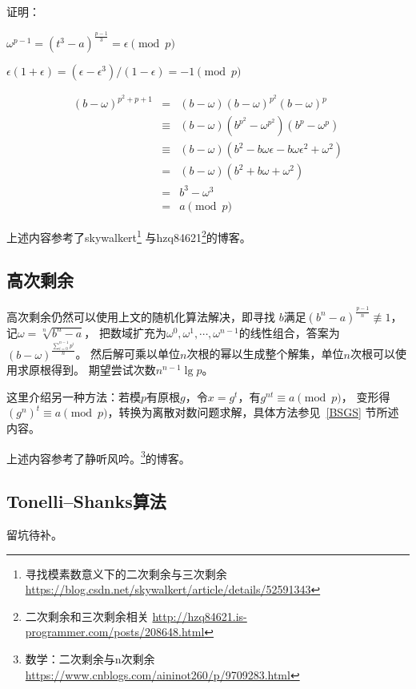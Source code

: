 证明：

\begin{lemma}
    $\omega^{p-1}=(t^3-a)^\frac{p-1}{3}=\epsilon \pmod{p}$
\end{lemma}

\begin{lemma}
    $\epsilon(1+\epsilon)=(\epsilon-\epsilon^3)/(1-\epsilon)= -1 \pmod{p}$
\end{lemma}

\begin{eqnarray*}
    (b-\omega)^{p^2+p+1}&=&(b-\omega)(b-\omega)^{p^2}(b-\omega)^p\\
    &\equiv&(b-\omega)(b^{p^2}-\omega^{p^2})(b^p-\omega^p)\\
    &\equiv&(b-\omega)(b^2-b\omega\epsilon-b\omega\epsilon^2+\omega^2)\\
    &=&(b-\omega)(b^2+b\omega+\omega^2)\\
    &=&b^3-\omega^3\\
    &=&a \pmod{p}
\end{eqnarray*}

上述内容参考了skywalkert\footnote{
  寻找模素数意义下的二次剩余与三次剩余
  \url{https://blog.csdn.net/skywalkert/article/details/52591343}
}
与hzq84621\footnote{
    二次剩余和三次剩余相关
    \url{http://hzq84621.is-programmer.com/posts/208648.html}
}的博客。
\subsection{高次剩余}
高次剩余仍然可以使用上文的随机化算法解决，即寻找
$b$满足$(b^n-a)^\frac{p-1}{n}\not \equiv 1$，记$\omega=\sqrt[n]{b^n-a}$，
把数域扩充为$\omega^0,\omega^1,\cdots,\omega^{n-1}$的线性组合，答案为
$(b-\omega)^\frac{\displaystyle \sum_{i=0}^{n-1}{p^i}}{n}$。
然后解可乘以单位$n$次根的幂以生成整个解集，单位$n$次根可以使用求原根得到。
期望尝试次数$n^{n-1}\lg p$。

这里介绍另一种方法：若模$p$有原根$g$，令$x=g^t$，有$g^{nt}\equiv a\pmod{p}$，
变形得$(g^n)^t\equiv a \pmod{p}$，转换为离散对数问题求解，具体方法参见~\ref{BSGS}
节所述内容。

上述内容参考了静听风吟。\footnote{
    数学：二次剩余与n次剩余
    \url{https://www.cnblogs.com/aininot260/p/9709283.html}
}的博客。
\subsection{Tonelli–Shanks算法}
留坑待补。

